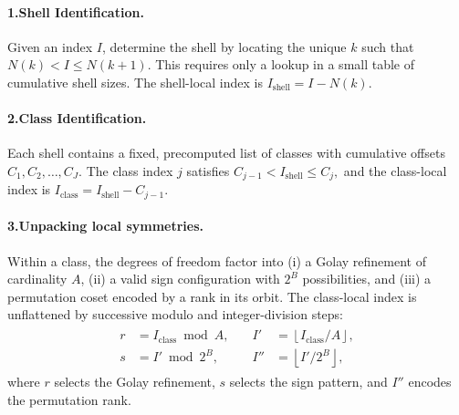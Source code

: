 \documentclass{article}
\theoremstyle{plain}
\theoremstyle{definition}
\theoremstyle{remark}
\begin{document}
\paragraph{1.\;Shell Identification.}
Given an index \(I\), determine the shell by locating the unique \(k\) such that
$
N(k) < I \le N(k+1).
$
This requires only a lookup in a small table of cumulative shell sizes. The shell-local index is
$
I_{\text{shell}} = I - N(k).
$
\vspace{-6pt}
\paragraph{2.\;Class Identification.}
Each shell contains a fixed, precomputed list of classes with cumulative offsets $
C_1, C_2, \dots, C_J.
$
The class index \(j\) satisfies
$
C_{j-1} < I_{\text{shell}} \le C_j,
$
and the class-local index is
$
I_{\text{class}} = I_{\text{shell}} - C_{j-1}.
$
\vspace{-6pt}
\paragraph{3.\;Unpacking local symmetries.}
Within a class, the degrees of freedom factor into (i) a Golay refinement of cardinality $A$, (ii) a valid sign configuration with $2^B$ possibilities, and (iii) a permutation coset encoded by a rank in its orbit. The class-local index is unflattened by successive modulo and integer-division steps:
{\setlength{\abovedisplayskip}{4pt}
\setlength{\belowdisplayskip}{4pt}
\setlength{\abovedisplayshortskip}{0pt}
\setlength{\belowdisplayshortskip}{2pt} %
\setlength{\jot}{3pt} %
\begin{align}
\begin{aligned}
r &= I_{\text{class}} \bmod A, \quad & I'   &= \left\lfloor I_{\text{class}}/A \right\rfloor,\\
s &= I' \bmod 2^{B},               \quad & I'' &= \left\lfloor I'/2^{B} \right\rfloor,
\end{aligned}
\end{align}
}
where $r$ selects the Golay refinement, $s$ selects the sign pattern, and $I''$ encodes the permutation rank.
\vspace{-6pt}
\end{document}
